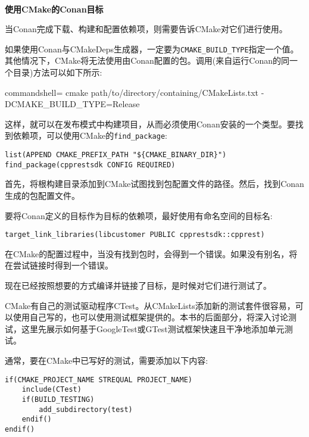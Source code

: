 \hspace*{\fill} \\ %
\noindent
\textbf{使用CMake的Conan目标}

当Conan完成下载、构建和配置依赖项，则需要告诉CMake对它们进行使用。

如果使用Conan与CMakeDeps生成器，一定要为\texttt{CMAKE\_BUILD\_TYPE}指定一个值。其他情况下，CMake将无法使用由Conan配置的包。调用(来自运行Conan的同一个目录)方法可以如下所示:

\begin{tcblisting}{commandshell={}}
cmake path/to/directory/containing/CMakeLists.txt -
DCMAKE_BUILD_TYPE=Release
\end{tcblisting}

这样，就可以在发布模式中构建项目，从而必须使用Conan安装的一个类型。要找到依赖项，可以使用CMake的\texttt{find\_package}:

\begin{lstlisting}[style=styleCMake]
list(APPEND CMAKE_PREFIX_PATH "${CMAKE_BINARY_DIR}")
find_package(cpprestsdk CONFIG REQUIRED)
\end{lstlisting}

首先，将根构建目录添加到CMake试图找到包配置文件的路径。然后，找到Conan生成的包配置文件。

要将Conan定义的目标作为目标的依赖项，最好使用有命名空间的目标名:

\begin{lstlisting}[style=styleCMake]
target_link_libraries(libcustomer PUBLIC cpprestsdk::cpprest)
\end{lstlisting}

在CMake的配置过程中，当没有找到包时，会得到一个错误。如果没有别名，将在尝试链接时得到一个错误。

现在已经按照想要的方式编译并链接了目标，是时候对它们进行测试了。


CMake有自己的测试驱动程序CTest。从CMakeLists添加新的测试套件很容易，可以使用自己写的，也可以使用测试框架提供的。本书的后面部分，将深入讨论测试，这里先展示如何基于GoogleTest或GTest测试框架快速且干净地添加单元测试。

通常，要在CMake中已写好的测试，需要添加以下内容:

\begin{lstlisting}[style=styleCMake]
if(CMAKE_PROJECT_NAME STREQUAL PROJECT_NAME)
	include(CTest)
	if(BUILD_TESTING)
		add_subdirectory(test)
	endif()
endif()
\end{lstlisting}


